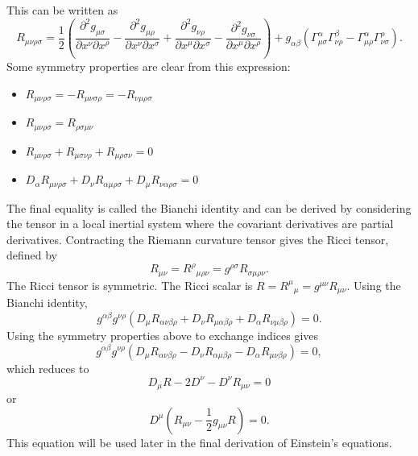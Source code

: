 \documentclass[11pt]{article}
\begin{document}
This can be written as
$$ R_{\mu \nu \rho \sigma} = \frac{1}{2} \left(\frac{\partial^2 g_{\mu \sigma}}{\partial x^\nu \partial x^\rho} - \frac{\partial^2 g_{\mu \rho}}{\partial x^\nu \partial x^\sigma} + \frac{\partial^2 g_{\nu \rho}}{\partial x^\mu \partial x^\sigma} - \frac{\partial^2 g_{\nu \sigma}}{\partial x^\mu \partial x^\rho} \right) + g_{\alpha \beta} \left( \Gamma^{\alpha}_{\mu \sigma} \Gamma^\beta_{\nu \rho} - \Gamma^\alpha_{\mu \rho} \Gamma^\rho_{\nu \sigma} \right). $$
Some symmetry properties are clear from this expression:
\begin{itemize}
\item $ R_{\mu \nu \rho \sigma} = -R_{\mu \nu \sigma \rho} = -R_{\nu \mu \rho \sigma} $
\item $ R_{\mu \nu \rho \sigma} = R_{\rho \sigma \mu \nu} $
\item $ R_{\mu \nu \rho \sigma} + R_{\mu \sigma \nu \rho} + R_{\mu \rho \sigma \nu} = 0 $
\item $ D_\alpha R_{\mu \nu \rho \sigma} + D_\nu R_{\alpha \mu \rho \sigma} + D_\mu R_{\nu \alpha \rho \sigma} = 0 $
\end{itemize}
The final equality is called the Bianchi identity and can be derived by considering the tensor in a local inertial system where the covariant derivatives are partial derivatives.
Contracting the Riemann curvature tensor gives the Ricci tensor, defined by
$$ R_{\mu \nu} = R^\rho{}_{\mu \rho \nu} = g^{\rho \sigma} R_{\sigma \mu \rho \nu}. $$
The Ricci tensor is symmetric.
The Ricci scalar is $R = R^\mu{}_\mu = g^{\mu \nu} R_{\mu \nu}$.
Using the Bianchi identity,
$$ g^{\alpha \beta} g^{\nu \rho} \left( D_\mu R_{\alpha \nu \beta \rho} + D_\nu R_{\mu \alpha \beta \rho} + D_\alpha R_{\nu \mu \beta \rho} \right) = 0. $$
Using the symmetry properties above to exchange indices gives
$$ g^{\alpha \beta} g^{\nu \rho} \left( D_\mu R_{\alpha \nu \beta \rho} - D_\nu R_{\alpha \mu \beta \rho} - D_\alpha R_{\mu \nu \beta \rho} \right) = 0, $$
which reduces to
$$ D_\mu R - 2 D^\nu - D^\nu R_{\mu \nu} = 0 $$
or
$$ D^\mu \left( R_{\mu \nu} - \frac{1}{2} g_{\mu \nu} R \right) = 0. $$
This equation will be used later in the final derivation of Einstein's equations.
\end{document}
